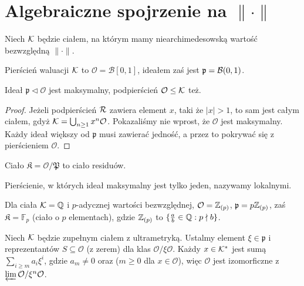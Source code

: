 \section{Algebraiczne spojrzenie na $\|\cdot\|$}
Niech $\mathcal K$ będzie ciałem, na którym mamy niearchimedesowską wartość bezwzględną $\|\cdot\|$.

\begin{definicja}
	Pierścień waluacji $\mathcal K$ to $\mathcal O = \mathcal B[0,1]$, ideałem zaś jest $\mathfrak p = \mathcal B(0, 1)$.
\end{definicja}

\begin{fakt}
	Ideał $\mathfrak p \triangleleft \mathcal O$ jest maksymalny, podpierścień $\mathcal O \le \mathcal K$ też.
\end{fakt}

\begin{proof}
	Jeżeli podpierścień $\mathcal R$ zawiera element $x$, taki że $|x| > 1$, to sam jest całym ciałem, gdyż $\mathcal K = \bigcup_{n \ge 1} x^n \mathcal O$.
	Pokazaliśmy nie wprost, że $\mathcal O$ jest maksymalny.
	Każdy ideał większy od $\mathfrak p$ musi zawierać jedność, a przez to pokrywać się z pierścieniem $\mathcal O$.
\end{proof}

\begin{definicja}
	Ciało $\mathfrak K = \mathcal O / \mathfrak P$ to ciało residuów.
\end{definicja}

Pierścienie, w których ideał maksymalny jest tylko jeden, nazywamy lokalnymi.

\begin{fakt}
	Dla ciała $\mathcal K = \mathbb Q$ i $p$-adycznej wartości bezwzględnej,
	$\mathcal O = \mathbb Z_{(p)}$,
	$\mathfrak p = p \mathbb Z_{(p)}$, zaś
	$\mathfrak K = \mathbb F_p$ (ciało o $p$ elementach), gdzie $\mathbb Z_{(p)}$ to $\{\frac a b \in \mathbb Q : p \nmid b\}$.
\end{fakt}

\begin{fakt} \label{libresoy}
	Niech $\mathcal K$ będzie zupełnym ciałem z ultrametryką.
	Ustalmy element $\xi \in \mathfrak p$ i reprezentantów $S \subseteq \mathcal O$ (z zerem) dla klas $\mathcal O / \xi \mathcal O$.
	Każdy $x \in \mathcal K^*$ jest sumą $\sum_{i \ge m} a_i \xi^i$, gdzie $a_m \neq 0$ oraz ($m \ge 0$ dla $x \in \mathcal O$), więc $\mathcal O$ jest izomorficzne z $\varprojlim \mathcal O / \xi^n \mathcal O$.
\end{fakt}

